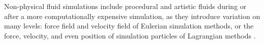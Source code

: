 Non-physical fluid simulations include procedural and artistic fluids during or after a more computationally expensive simulation, as they introduce variation on many levels: force field and velocity field of Eulerian simulation methods, or the force, velocity, and even position of simulation particles of Lagrangian methods \cite{Sims1990}.






